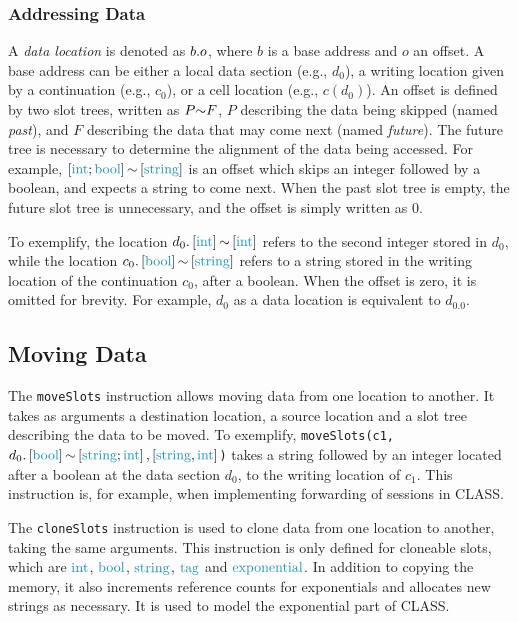 \subsubsection{Addressing Data} \label{subsection:DataAddressing}

A \textit{data location} is denoted as $b.o$, where $b$ is a base address and $o$ an offset. A base address can be either a local data section (e.g., $d_0$), a writing location given by a continuation (e.g., $c_0$), or a cell location (e.g., $c(d_0)$). An offset is defined by two slot trees, written as $P\text{$\sim$}F$, $P$ describing the data being skipped (named \textit{past}), and $F$ describing the data that may come next (named \textit{future}). The future tree is necessary to determine the alignment of the data being accessed. For example, $\offs{\seqst{\ints; \bools}}{\seqst{\strings}}$ is an offset which skips an integer followed by a boolean, and expects a string to come next. When the past slot tree is empty, the future slot tree is unnecessary, and the offset is simply written as $0$. 

To exemplify, the location $\datal{d_0}{\seqst{\ints}}{\seqst{\ints}}$ refers to the second integer stored in $d_0$, while the location $\datal{c_0}{\seqst{\bools}}{\seqst{\strings}}$ refers to a string stored in the writing location of the continuation $c_0$, after a boolean. When the offset is zero, it is omitted for brevity. For example, $d_0$ as a data location is equivalent to $d_0.0$.

\subsection{Moving Data}

The \texttt{moveSlots} instruction allows moving data from one location to another. It takes as arguments a destination location, a source location and a slot tree describing the data to be moved. To exemplify, \texttt{moveSlots(c1, $\datal{d_0}{\seqst{\bools}}{\seqst{\strings; \ints}}, \seqst{\strings, \ints}$)} takes a string followed by an integer located after a boolean at the data section $d_0$, to the writing location of $c_1$. This instruction is, for example, when implementing forwarding of sessions in \ac{CLASS}. 

The \texttt{cloneSlots} instruction is used to clone data from one location to another, taking the same arguments. This instruction is only defined for cloneable slots, which are $\ints$, $\bools$, $\strings$, $\tags$ and $\exponentials$. In addition to copying the memory, it also increments reference counts for exponentials and allocates new strings as necessary. It is used to model the exponential part of \ac{CLASS}.

